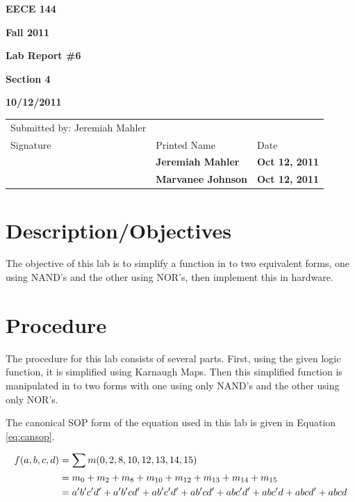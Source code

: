 \documentclass[12pt]{article}
\begin{document}

\centerline{\bf EECE 144}
\centerline{\bf Fall 2011}
\centerline{\bf}
\centerline{\bf Lab Report \#6}
\centerline{\bf Section 4}
\centerline{\bf 10/12/2011}

\begin{center}
\begin{tabularx}{\textwidth}[b]{X l l}
Submitted by: Jeremiah Mahler & & \\
Signature & Printed Name & Date \\
\hline
\multicolumn{1}{|X|}{} & \multicolumn{1}{|l|}{\bigstrut \bf Jeremiah Mahler} & \multicolumn{1}{|l|}{\bf Oct 12, 2011} \\
\hline
\multicolumn{1}{|X|}{} & \multicolumn{1}{|l|}{\bigstrut \bf Marvanee Johnson} & \multicolumn{1}{|l|}{\bf Oct 12, 2011} \\
\hline
\end{tabularx}
\end{center}

\section{Description/Objectives}

The objective of this lab is to simplify a function in to
two equivalent forms, one using NAND's and the other using NOR's,
then implement this in hardware.

\section{Procedure}
\label{sec:procedure}

The procedure for this lab consists of several parts.
First, using the given logic function, it is simplified
using Karnaugh Maps.
Then this simplified function is manipulated in to two
forms with one using only NAND's and the other using only NOR's.

The canonical SOP form of the equation used in this lab is
given in Equation \ref{eq:cansop}.

\begin{align}
f(a, b, c, d) &= \sum m(0, 2, 8, 10, 12, 13, 14, 15) \label{eq:cansop} \\
	    &= m_0 + m_2 + m_8 + m_{10} + m_{12} + m_{13} + m_{14} + m_{15}\notag \\
		&= a'b'c'd' + a'b'cd' + ab'c'd' + ab'cd' + abc'd' + abc'd + abcd' + abcd \notag
\end{align}
\end{document}
